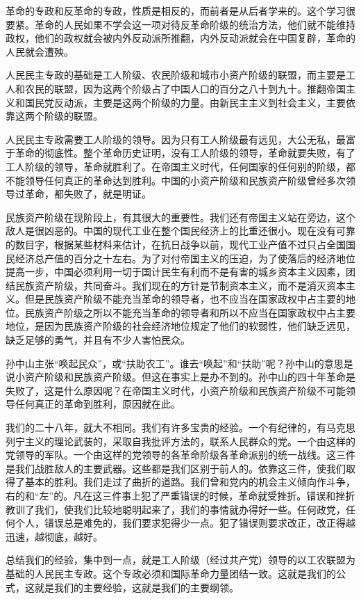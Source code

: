 革命的专政和反革命的专政，性质是相反的，而前者是从后者学来的。这个学习很要紧。革命的人民如果不学会这一项对待反革命阶级的统治方法，他们就不能维持政权，他们的政权就会被内外反动派所推翻，内外反动派就会在中国复辟，革命的人民就会遭殃。

人民民主专政的基础是工人阶级、农民阶级和城市小资产阶级的联盟，而主要是工人和农民的联盟，因为这两个阶级占了中国人口的百分之八十到九十。推翻帝国主义和国民党反动派，主要是这两个阶级的力量。由新民主主义到社会主义，主要依靠这两个阶级的联盟。

人民民主专政需要工人阶级的领导。因为只有工人阶级最有远见，大公无私，最富于革命的彻底性。整个革命历史证明，没有工人阶级的领导，革命就要失败，有了工人阶级的领导，革命就胜利了。在帝国主义时代，任何国家的任何别的阶级，都不能领导任何真正的革命达到胜利。中国的小资产阶级和民族资产阶级曾经多次领导过革命，都失败了，就是明证。

民族资产阶级在现阶段上，有其很大的重要性。我们还有帝国主义站在旁边，这个敌人是很凶恶的。中国的现代工业在整个国民经济上的比重还很小。现在没有可靠的数目字，根据某些材料来估计，在抗日战争以前，现代工业产值不过只占全国国民经济总产值的百分之十左右。为了对付帝国主义的压迫，为了使落后的经济地位提高一步，中国必须利用一切于国计民生有利而不是有害的城乡资本主义因素，团结民族资产阶级，共同奋斗。我们现在的方针是节制资本主义，而不是消灭资本主义。但是民族资产阶级不能充当革命的领导者，也不应当在国家政权中占主要的地位。民族资产阶级之所以不能充当革命的领导者和所以不应当在国家政权中占主要地位，是因为民族资产阶级的社会经济地位规定了他们的软弱性，他们缺乏远见，缺乏足够的勇气，并且有不少人害怕民众。

孙中山主张“唤起民众”，或“扶助农工”。谁去“唤起”和“扶助”呢？孙中山的意思是说小资产阶级和民族资产阶级。但这在事实上是办不到的。孙中山的四十年革命是失败了，这是什么原因呢？在帝国主义时代，小资产阶级和民族资产阶级不可能领导任何真正的革命到胜利，原因就在此。

我们的二十八年，就大不相同。我们有许多宝贵的经验。一个有纪律的，有马克思列宁主义的理论武装的，采取自我批评方法的，联系人民群众的党。一个由这样的党领导的军队。一个由这样的党领导的各革命阶级各革命派别的统一战线。这三件是我们战胜敌人的主要武器。这些都是我们区别于前人的。依靠这三件，使我们取得了基本的胜利。我们走过了曲折的道路。我们曾和党内的机会主义倾向作斗争，右的和“左”的。凡在这三件事上犯了严重错误的时候，革命就受挫折。错误和挫折教训了我们，使我们比较地聪明起来了，我们的事情就办得好一些。任何政党，任何个人，错误总是难免的，我们要求犯得少一点。犯了错误则要求改正，改正得越迅速，越彻底，越好。

总结我们的经验，集中到一点，就是工人阶级（经过共产党）领导的以工农联盟为基础的人民民主专政。这个专政必须和国际革命力量团结一致。这就是我们的公式，这就是我们的主要经验，这就是我们的主要纲领。

